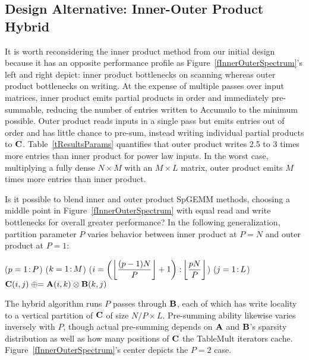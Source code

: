 \subsection{Design Alternative: Inner-Outer Product Hybrid}

It is worth reconsidering the inner product method from our initial design
because it has an opposite performance profile as 
Figure~\ref{fInnerOuterSpectrum}'s left and right depict: 
inner product bottlenecks on scanning whereas outer product bottlenecks on writing.
At the expense of multiple passes over input matrices, inner product emits 
partial products in order and immediately pre-summable,
reducing the number of entries written to Accumulo to the minimum possible.
Outer product reads inputs in a single pass
but emits entries out of order and has little chance to pre-sum, 
instead writing individual partial products to $\mathbf{C}$.
Table~\ref{tResultsParams} quantifies that outer product writes
2.5 to 3 times more entries than inner product for power law inputs.
In the worst case, multiplying a fully dense $N \times M$ with an $M \times L$ matrix,
outer product emits $M$ times more entries than inner product.



Is it possible to blend inner and outer product SpGEMM methods,
choosing a middle point in Figure~\ref{fInnerOuterSpectrum}
with equal read and write bottlenecks for overall greater performance?
In the following generalization, 
partition parameter $P$ varies behavior between
inner product at $P=N$ and outer product at $P=1$:

\removelatexerror
\begin{algorithm}[H]
\vspace{\algspace}
\fore($p = 1\colon\! P$){
\fore($k = 1\colon\! M$){
\fore({$i = \left( \floor*{\dfrac{(p-1)N}{P}}+1 \right) \col \floor*{\dfrac{p N}{P}}$}){
\fore($j = 1\colon\! L$){
{$\mathbf{C}(i,j) \mathrel{\oplus}= \mathbf{A}(i,k) \otimes \mathbf{B}(k,j)$}
}}}}
\vspace{\algspace}
\end{algorithm}

The hybrid algorithm runs $P$ passes through $\mathbf{B}$,
each of which has write locality to a vertical partition of $\mathbf{C}$ of size $N/P \times L$.
Pre-summing ability likewise varies inversely with $P$, 
though actual pre-summing depends on
$\mathbf{A}$ and $\mathbf{B}$'s  sparsity distribution
as well as how many positions of $\mathbf{C}$ the TableMult iterators cache.
Figure~\ref{fInnerOuterSpectrum}'s center depicts the $P=2$ case.

